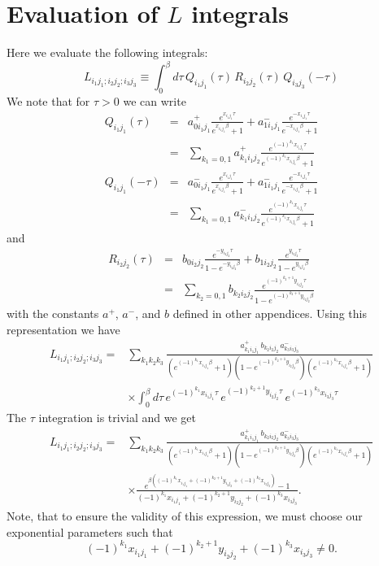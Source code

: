 \chapter{Evaluation of $L$ integrals}

Here we evaluate the following integrals:
\begin{equation}
L_{i_1 j_1; i_2 j_2; i_3 j_3}  \equiv 
\int_0^{\beta}d\tau\,
Q_{i_1 j_1}(\tau)\,R_{i_2 j_2}(\tau)\,Q_{i_3 j_3}(-\tau) 
\end{equation}
We note that for $\tau > 0$ we can write
\begin{eqnarray}
Q_{i_1 j_1}(\tau) & = & a^{+}_{0 i_1 j_1} 
\frac{e^{x_{i_1 j_1} \tau}}{e^{x_{i_1 j_1} \beta}+1} +
a^{-}_{1 i_1 j_1}
\frac{e^{-x_{i_1 j_1} \tau}}{e^{-x_{i_1 j_1} \beta}+1} \\ 
& = & \sum_{k_1=0,1} a^{+}_{k_1 i_1 j_2} 
\frac{e^{(-1)^{k_1}x_{i_1 j_1} \tau}}
{e^{(-1)^{k_1}x_{i_1 j_1} \beta}+1} \\
Q_{i_1 j_1}(-\tau) & = & a^{-}_{0 i_1 j_1} 
\frac{e^{x_{i_1 j_1} \tau}}{e^{x_{i_1 j_1} \beta}+1} +
a^{-}_{1 i_1 j_1}
\frac{e^{-x_{i_1 j_1} \tau}}{e^{-x_{i_1 j_1} \beta}+1} \\
& = & \sum_{k_1=0,1} a^{-}_{k_1 i_1 j_2} 
\frac{e^{(-1)^{k_1}x_{i_1 j_1} \tau}}
{e^{(-1)^{k_1}x_{i_1 j_1} \beta}+1} 
\end{eqnarray}
and
\begin{eqnarray}
R_{i_2 j_2}(\tau) & = & b_{0 i_2 j_2} 
\frac{e^{-y_{i_2 j_2} \tau}}{1 - e^{-y_{i_2 j_2} \beta}} +
b_{1 i_2 j_2}
\frac{e^{y_{i_2 j_2} \tau}}{1 - e^{y_{i_2 j_2} \beta}} \\
& = & \sum_{k_2=0,1} b_{k_2 i_2 j_2}\frac{e^{(-1)^{k_2+1}y_{i_2 j_2} \tau}}
{1 - e^{(-1)^{k_2+1}y_{i_2 j_2} \beta}}
\end{eqnarray}
with the constants $a^+$, $a^-$, and $b$ defined
in other appendices.
Using this representation we have
\begin{equation}
\begin{split}
L_{i_1 j_1; i_2 j_2; i_3 j_3}
= & 
\sum_{k_1 k_2 k_3}\frac{a^{+}_{k_1 i_1 j_1}\,b_{k_2 i_2 j_2}\,
a^{-}_{k_3 i_3 j_3}}
{(e^{(-1)^{k_1}x_{i_1 j_1} \beta}+1)
(1 - e^{(-1)^{k_2+1}y_{i_2 j_2} \beta})
(e^{(-1)^{k_1}x_{i_1 j_1} \beta}+1)}
\\
& \times
\int_0^{\beta}d\tau\,
e^{(-1)^{k_1}x_{i_1 j_1} \tau}\,
e^{(-1)^{k_2+1}y_{i_2 j_2} \tau}\,
e^{(-1)^{k_3}x_{i_3 j_3} \tau}
\end{split}
\end{equation}
The $\tau$ integration is trivial and we get
\begin{equation}
\begin{split}
L_{i_1 j_1; i_2 j_2; i_3 j_3}
= & 
\sum_{k_1 k_2 k_3}\frac{a^{+}_{k_1 i_1 j_1}\,b_{k_2 i_2 j_2}\,
a^{-}_{k_3 i_3 j_3}}
{(e^{(-1)^{k_1}x_{i_1 j_1} \beta}+1)
(1 - e^{(-1)^{k_2+1}y_{i_2 j_2} \beta})
(e^{(-1)^{k_1}x_{i_1 j_1} \beta}+1)}
\\
& \times
\frac{ e^{\beta((-1)^{k_1}x_{i_1 j_1} + (-1)^{k_2 + 1}y_{i_2 j_2} 
 + (-1)^{k_3}x_{i_3 j_3})} - 1}
{(-1)^{k_1}x_{i_1 j_1} + (-1)^{k_2 + 1}y_{i_2 j_2} 
+ (-1)^{k_3}x_{i_3 j_3}}.
\end{split}
\end{equation}
Note, that to ensure the validity of this expression, we must
choose our exponential parameters such that
\begin{equation}
(-1)^{k_1}x_{i_1 j_1} + (-1)^{k_2 + 1}y_{i_2 j_2} 
+ (-1)^{k_3}x_{i_3 j_3} \neq 0.
\end{equation}

